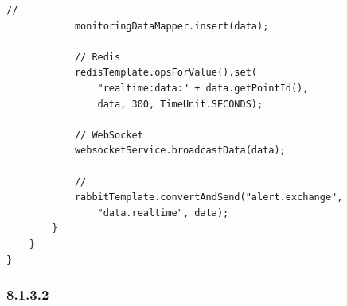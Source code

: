 \begin{lstlisting}[style=java]
            // 
            monitoringDataMapper.insert(data);
            
            // Redis
            redisTemplate.opsForValue().set(
                "realtime:data:" + data.getPointId(), 
                data, 300, TimeUnit.SECONDS);
            
            // WebSocket
            websocketService.broadcastData(data);
            
            // 
            rabbitTemplate.convertAndSend("alert.exchange", 
                "data.realtime", data);
        }
    }
}
\end{lstlisting}

\hypertarget{section-45}{%
\subsubsection{8.1.3.2}\label{section-45}}

\hypertarget{section-46}{%
\paragraph{}\label{section-46}}

